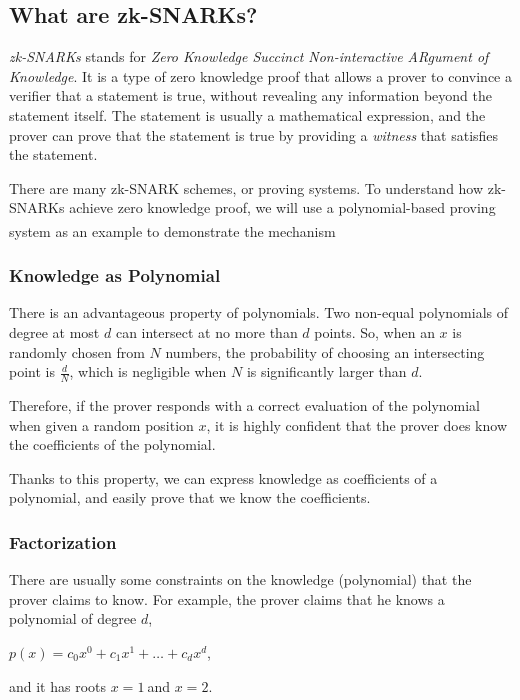 \documentclass[
]{report}
\begin{document}
\subsection{What are zk-SNARKs?}

\emph{zk-SNARKs} stands for \emph{Zero Knowledge Succinct
Non-interactive ARgument of Knowledge}. It is a type of zero knowledge
proof that allows a prover to convince a verifier that a statement is
true, without revealing any information beyond the statement itself. The
statement is usually a mathematical expression, and the prover can prove
that the statement is true by providing a \emph{witness} that satisfies
the statement.

There are many zk-SNARK schemes, or proving systems. To understand how
zk-SNARKs achieve zero knowledge proof, we will use a polynomial-based
proving system as an example to demonstrate the
mechanism\textsuperscript{\cite{DBLP:journals/corr/abs-1906-07221}}

\subsubsection{Knowledge as Polynomial}

There is an advantageous property of polynomials. Two non-equal
polynomials of degree at most \(d\) can intersect at no more than \(d\)
points. So, when an \(x\) is randomly chosen from \(N\) numbers, the
probability of choosing an intersecting point is \(\frac{d}{N}\), which
is negligible when \(N\) is significantly larger than \(d\).

Therefore, if the prover responds with a correct evaluation of the
polynomial when given a random position \(x\), it is highly confident
that the prover does know the coefficients of the polynomial.

Thanks to this property, we can express knowledge as coefficients of a
polynomial, and easily prove that we know the coefficients.

\subsubsection{Factorization}

There are usually some constraints on the knowledge (polynomial) that
the prover claims to know. For example, the prover claims that he knows
a polynomial of degree \(d\),

\(p(x) = c_{0}x^{0} + c_{1}x^{1} + \ldots + c_{d}x^{d}\),

and it has roots \(x = 1\ \)and \(x = 2\).
\end{document}
